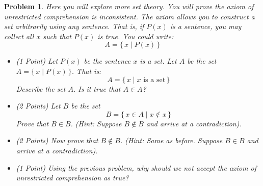 \documentclass{article}
\theoremstyle{normal}
\newtheorem{problem}{Problem}
\begin{document}
    \clearpage
    \color{blue}
    \begin{problem}
        Here you will explore more set theory. You will prove the
        \textit{axiom of unrestricted comprehension} is inconsistent. The axiom
        allows you to construct a set arbitrarily using any sentence. That is,
        if $P(x)$ is a sentence, you may collect all $x$ such that $P(x)$ is
        true. You could write:
        \begin{equation}
            A=\{\,x\;|\;P(x)\,\}\nonumber
        \end{equation}
        \begin{itemize}
            \item (1 Point) Let $P(x)$ be the sentence $x$ \textit{is a set}.
                Let $A$ be the set $A=\{\,x\;|\;P(x)\,\}$. That is:
                \begin{equation}
                    A=\{\,x\;|\;x\textrm{ is a set}\,\}\nonumber
                \end{equation}
                Describe the set $A$. Is it true that $A\in{A}$?
            \item (2 Points) Let $B$ be the set
                \begin{equation}
                    B=\{\,x\in{A}\;|\;x\notin{x}\,\}\nonumber
                \end{equation}
                Prove that $B\in{B}$. (Hint: Suppose $B\notin{B}$ and arrive
                at a contradiction).
            \item (2 Points) Now prove that $B\notin{B}$.
                (Hint: Same as before. Suppose $B\in{B}$ and arrive at a
                contradiction).
            \item (1 Point) Using the previous problem, why should we not accept
                the axiom of unrestricted comprehension as true?
        \end{itemize}
    \end{problem}
    \color{black}
\end{document}
